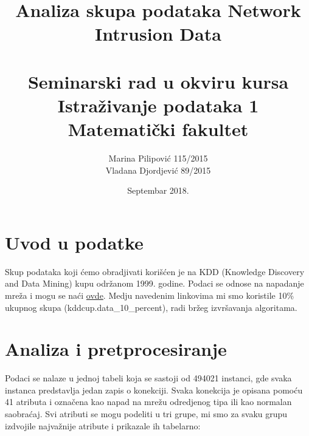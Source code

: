 \documentclass[10pt]{article}
\title{Analiza skupa podataka Network Intrusion Data\\~\\ \small{ Seminarski rad u okviru kursa\\Istra\v zivanje podataka 1} \\ \small{Matemati\v cki fakultet}}
\author{Marina Pilipovi\' c 115/2015\\Vladana  Djordjevi\' c 89/2015}
\date{Septembar 2018.}
\begin{document}
\maketitle

\section{Uvod u podatke}
Skup podataka koji \' cemo obradjivati kori\v s\' cen je na KDD (Knowledge Discovery and Data Mining) kupu odr\v zanom 1999. godine. Podaci se odnose na napadanje mre\v za i mogu se na\' ci \href{http://kdd.ics.uci.edu/databases/kddcup99/kddcup99.html}{ovde}. Medju navedenim linkovima mi smo koristile 10\% ukupnog skupa (kddcup.data\_10\_percent), radi br\v zeg izvr\v savanja algoritama.

\section{Analiza i pretprocesiranje}
Podaci se nalaze u jednoj tabeli koja se sastoji od 494021 instanci, gde svaka instanca predstavlja jedan zapis o konekciji. Svaka konekcija je opisana pomo\' cu 41 atributa i ozna\v cena kao napad na mre\v zu odredjenog tipa ili kao normalan saobra\' caj.
Svi atributi se mogu podeliti u tri grupe, mi smo za svaku grupu izdvojile najva\v znije atribute i prikazale ih tabelarno:
\end{document}
